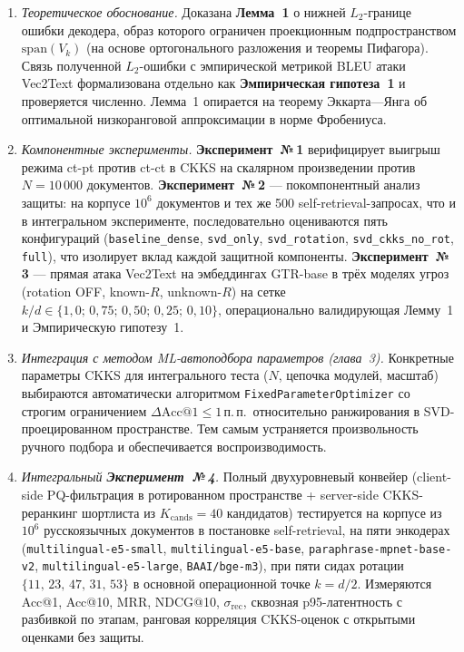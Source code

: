 \documentclass[a4paper, 12pt, oneside, openany]{article}
\begin{document}
\begin{enumerate}
	\def\labelenumi{\arabic{enumi}.}
	\item \emph{Теоретическое обоснование.} Доказана \textbf{Лемма~1} о нижней $L_2$-границе ошибки декодера, образ которого ограничен проекционным подпространством $\mathrm{span}(V_k)$ (на основе ортогонального разложения и теоремы Пифагора). Связь полученной $L_2$-ошибки с эмпирической метрикой BLEU атаки Vec2Text формализована отдельно как \textbf{Эмпирическая гипотеза~1} и проверяется численно. Лемма~1 опирается на теорему Эккарта---Янга об оптимальной низкоранговой аппроксимации в норме Фробениуса.
	\item \emph{Компонентные эксперименты.} \textbf{Эксперимент~№\,1} верифицирует выигрыш режима ct-pt против ct-ct в CKKS на скалярном произведении против $N{=}10\,000$ документов. \textbf{Эксперимент~№\,2} --- покомпонентный анализ защиты: на корпусе $10^6$ документов и тех же 500 self-retrieval-запросах, что и в интегральном эксперименте, последовательно оцениваются пять конфигураций (\texttt{baseline\_dense}, \texttt{svd\_only}, \texttt{svd\_rotation}, \texttt{svd\_ckks\_no\_rot}, \texttt{full}), что изолирует вклад каждой защитной компоненты. \textbf{Эксперимент~№\,3} --- прямая атака Vec2Text на эмбеддингах GTR-base в трёх моделях угроз (rotation OFF, known-$R$, unknown-$R$) на сетке $k/d \in \{1{,}0;\,0{,}75;\,0{,}50;\,0{,}25;\,0{,}10\}$, операционально валидирующая Лемму~1 и Эмпирическую гипотезу~1.
	\item \emph{Интеграция с методом ML-автоподбора параметров (глава~3).} Конкретные параметры CKKS для интегрального теста ($N$, цепочка модулей, масштаб) выбираются автоматически алгоритмом \texttt{FixedParameterOptimizer} со строгим ограничением $\Delta\mathrm{Acc@1} \leq 1$\,п.\,п.\ относительно ранжирования в SVD-проецированном пространстве. Тем самым устраняется произвольность ручного подбора и обеспечивается воспроизводимость.
	\item \emph{Интегральный \textbf{Эксперимент~№\,4}.} Полный двухуровневый конвейер (client-side PQ-фильтрация в ротированном пространстве + server-side CKKS-реранкинг шортлиста из $K_{\mathrm{cands}} = 40$ кандидатов) тестируется на корпусе из $10^6$ русскоязычных документов в постановке self-retrieval, на пяти энкодерах (\texttt{multilingual-e5-small}, \texttt{multilingual-e5-base}, \texttt{paraphrase-mpnet-base-v2}, \texttt{multilingual-e5-large}, \texttt{BAAI/bge-m3}), при пяти сидах ротации $\{11,\,23,\,47,\,31,\,53\}$ в основной операционной точке $k = d/2$. Измеряются Acc@1, Acc@10, MRR, NDCG@10, $\sigma_{\mathrm{rec}}$, сквозная p95-латентность с разбивкой по этапам, ранговая корреляция CKKS-оценок с открытыми оценками без защиты.
\end{enumerate}
\end{document}
